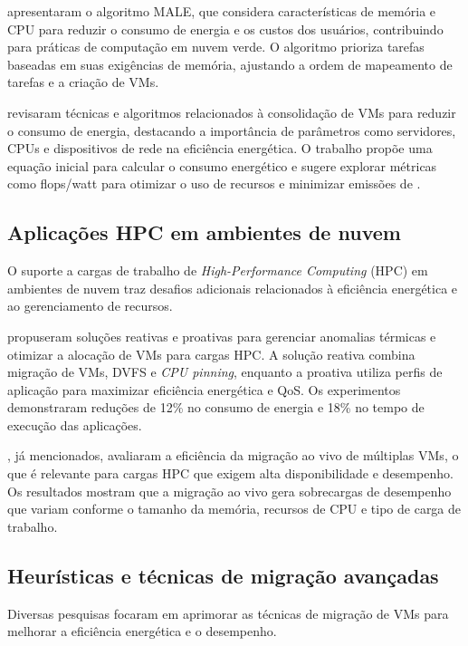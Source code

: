 \documentclass[
	12pt,				%
	oneside,			%
	a4paper,			%
	english,			%
	brazil				%
	]{abntex2ppgsi}
\begin{document}
 apresentaram o algoritmo MALE, que considera características de memória e CPU para reduzir o consumo de energia e os custos dos usuários, contribuindo para práticas de computação em nuvem verde. O algoritmo prioriza tarefas baseadas em suas exigências de memória, ajustando a ordem de mapeamento de tarefas e a criação de VMs.

 revisaram técnicas e algoritmos relacionados à consolidação de VMs para reduzir o consumo de energia, destacando a importância de parâmetros como servidores, CPUs e dispositivos de rede na eficiência energética. O trabalho propõe uma equação inicial para calcular o consumo energético e sugere explorar métricas como flops/watt para otimizar o uso de recursos e minimizar emissões de .

\subsection{Aplicações HPC em ambientes de nuvem}

O suporte a cargas de trabalho de \textit{High-Performance Computing} (HPC) em ambientes de nuvem traz desafios adicionais relacionados à eficiência energética e ao gerenciamento de recursos.

 propuseram soluções reativas e proativas para gerenciar anomalias térmicas e otimizar a alocação de VMs para cargas HPC. A solução reativa combina migração de VMs, DVFS e \textit{CPU pinning}, enquanto a proativa utiliza perfis de aplicação para maximizar eficiência energética e QoS. Os experimentos demonstraram reduções de 12\% no consumo de energia e 18\% no tempo de execução das aplicações.

, já mencionados, avaliaram a eficiência da migração ao vivo de múltiplas VMs, o que é relevante para cargas HPC que exigem alta disponibilidade e desempenho. Os resultados mostram que a migração ao vivo gera sobrecargas de desempenho que variam conforme o tamanho da memória, recursos de CPU e tipo de carga de trabalho.

\subsection{Heurísticas e técnicas de migração avançadas}

Diversas pesquisas focaram em aprimorar as técnicas de migração de VMs para melhorar a eficiência energética e o desempenho.
\end{document}
